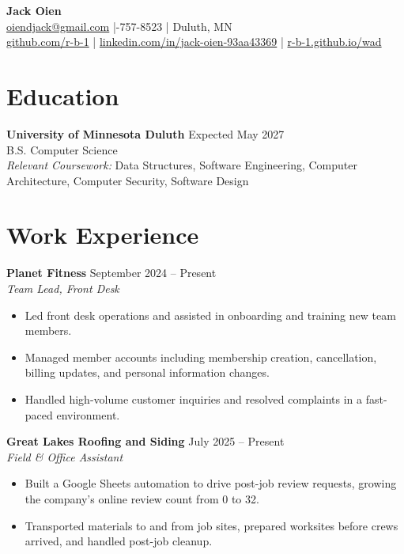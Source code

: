 \documentclass[letterpaper,10.5pt]{article}
\begin{document}
\begin{center}
  {\LARGE \textbf{Jack Oien}} \\[4pt]
  \href{mailto:oiendjack@gmail.com}{oiendjack@gmail.com} \;|-757-8523 \;|\;
  Duluth, MN \\[2pt]
  \href{https://github.com/r-b-1}{github.com/r-b-1} \;|\;
  \href{https://linkedin.com/in/jack-oien-93aa43369}{linkedin.com/in/jack-oien-93aa43369} \;|\;
  \href{https://r-b-1.github.io/wad}{r-b-1.github.io/wad}
\end{center}

\section{Education}

\textbf{University of Minnesota Duluth} \hfill Expected May 2027 \\
B.S. Computer Science \\
\textit{Relevant Coursework:} Data Structures, Software Engineering,
Computer Architecture, Computer Security, Software Design

\section{Work Experience}

\textbf{Planet Fitness} \hfill September 2024 -- Present \\
\textit{Team Lead, Front Desk}
\begin{itemize}[leftmargin=1.5em, itemsep=1pt, topsep=3pt]
  \item Led front desk operations and assisted in onboarding and
        training new team members.
  \item Managed member accounts including membership creation,
        cancellation, billing updates, and personal information changes.
  \item Handled high-volume customer inquiries and resolved complaints
        in a fast-paced environment.
\end{itemize}

\textbf{Great Lakes Roofing and Siding} \hfill July 2025 -- Present \\
\textit{Field \& Office Assistant}
\begin{itemize}[leftmargin=1.5em, itemsep=1pt, topsep=3pt]
  \item Built a Google Sheets automation to drive post-job review
        requests, growing the company's online review count from 0 to 32.
  \item Transported materials to and from job sites, prepared
        worksites before crews arrived, and handled post-job cleanup.
\end{itemize}
\end{document}

